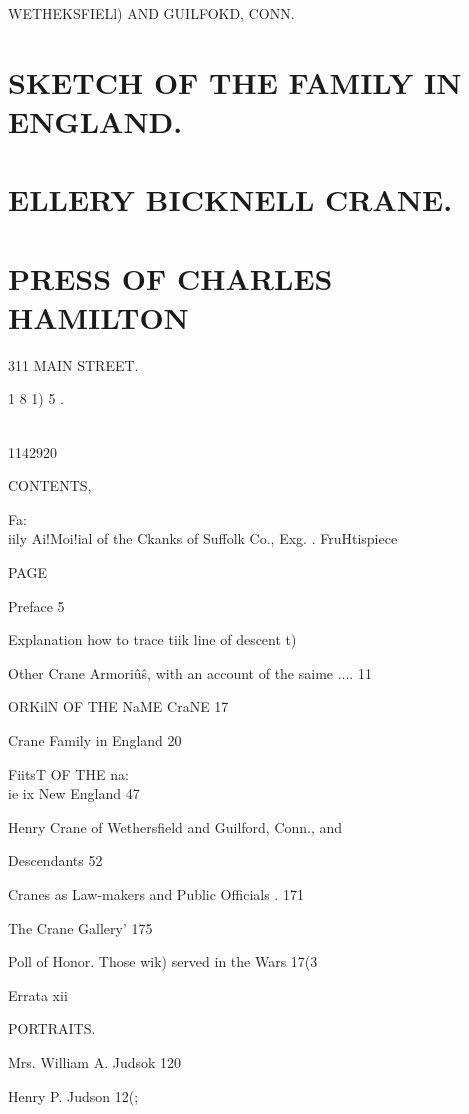\documentclass{book}
\begin{document}
WETHEKSFIELl) AND GUILFOKD, CONN. 



\chapter{SKETCH OF THE FAMILY IN ENGLAND.}


\chapter{ELLERY BICKNELL CRANE.}


\chapter{PRESS OF CHARLES HAMILTON}311 MAIN STREET. 

1 8 1) 5 . 



\^\\ 



1142920 

CONTENTS, 



Fa:\\iily Ai!Moi!ial of the Ckanks of Suffolk Co., Exg. . FruHtispiece 

PAGE 

Preface 5 

Explanation how to trace tiik line of descent t) 

Other Crane Armori\^u\^s, with an account of the saime .... 11 

ORKilN OF THE NaME CraNE  17 

Crane Family in England 20 

FiitsT OF THE na:\\ie ix New England 47 

Henry Crane of Wethersfield and Guilford, Conn., and 

Descendants 52 

Cranes as Law-makers and Public Officials  . 171 

The Crane Gallery' 175 

Poll of Honor. Those wik) served in the Wars 17(3 

Errata xii 



PORTRAITS. 



Mrs. William A. Judsok 120 

Henry P. Judson 12(; 
\end{document}
